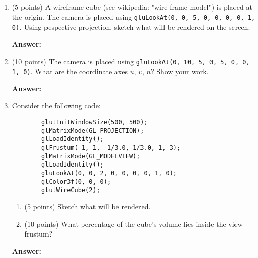 \documentclass[13pt]{letter}
\begin{document}
\begin{enumerate}
$$  \right] $$
  $$ M = \left[
  \begin{array}{ccc}
     \cos{90} &  \sin{90} & x \\
    -\sin{90} &  \cos{90} & 0 \\
            0 &         0 & 1
  \end{array}
  \right]
  \left[
  \begin{array}{ccc}
    1 &  0 & -x \\
    0 &  1 & -y \\
    0 &  0 &  1
  \end{array}
  \right]
  $$
  $$ M = \left[
  \begin{array}{ccc}
     \cos{90} &  \sin{90} & -x\cos{90} - y\sin{90} + x \\
    -\sin{90} &  \cos{90} &  x\sin{90} - y\cos{90} \\
            0 &         0 & 1
  \end{array}
  \right] $$
	\vspace{13pt}
	
	\item (5 points)
	A wireframe cube (see wikipedia: "wire-frame model") is placed at the origin. The camera is placed using \texttt{gluLookAt(0, 0, 5, 0, 0, 0, 0, 1, 0)}. Using pespective projection, sketch what will be rendered on the screen.
	
	\textbf{Answer:} \\
	

	\vspace{13pt}

	\item (10 points)
	The camera is placed using \texttt{gluLookAt(0, 10, 5, 0, 5, 0, 0, 1, 0)}. What are the coordinate axes $u$, $v$, $n$? Show your work.

  \textbf{Answer:} \\
  
	\vspace{13pt}

	\item 
	Consider the following code:
	
	\begin{verbatim}
		glutInitWindowSize(500, 500);
		glMatrixMode(GL_PROJECTION);
		glLoadIdentity();
		glFrustum(-1, 1, -1/3.0, 1/3.0, 1, 3);
		glMatrixMode(GL_MODELVIEW);
		glLoadIdentity();
		gluLookAt(0, 0, 2, 0, 0, 0, 0, 1, 0);
		glColor3f(0, 0, 0);
		glutWireCube(2);
	\end{verbatim}
	\begin{enumerate}
		\item (5 points)
		Sketch what will be rendered.

		\item (10 points) 
		What percentage of the cube’s volume lies inside the view frustum?
	
	\end{enumerate}
	
	\textbf{Answer:} \\
\end{enumerate}
\end{document}
